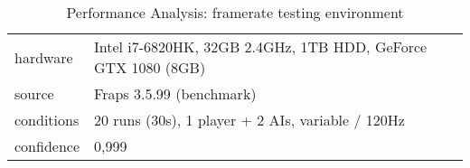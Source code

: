 \begin{table}[!ht]
	\centering
    \begin{tabular}{l|l}
        hardware & Intel i7-6820HK, 32GB 2.4GHz, 1TB HDD, GeForce GTX 1080 (8GB) \\
		source & Fraps 3.5.99 (benchmark) \\
		conditions & 20 runs (30s), 1 player + 2 AIs, variable / 120Hz \\
		confidence & 0,999 \\
    \end{tabular}

	\caption{Performance Analysis: framerate testing environment}\label{tb:performance:framerate}
\end{table}
